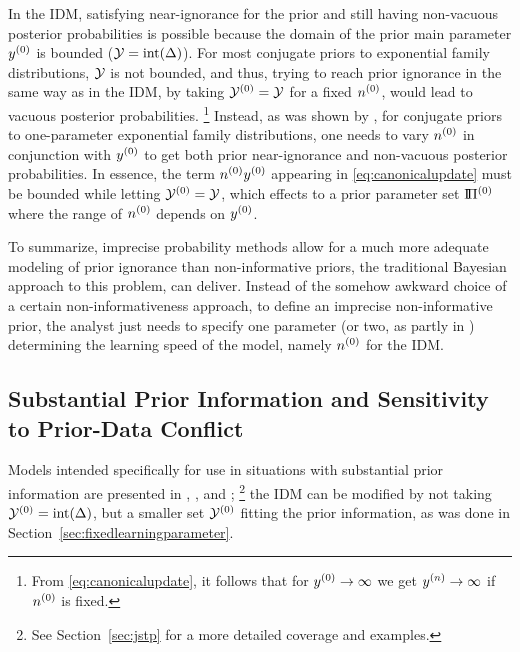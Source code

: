 In the IDM, satisfying near-ignorance for the prior and still having non-vacuous posterior probabilities is possible
because the domain of the prior main parameter $y^{(0)}$ is bounded ($\mathcal{Y} = \text{int}(\Delta)$).
For most conjugate priors to exponential family distributions, $\mathcal{Y}$ is not bounded,
and thus, trying to reach prior ignorance in the same way as in the IDM,
by taking $\mathcal{Y}^{(0)} = \mathcal{Y}$ for a fixed $n^{(0)}$, would lead to vacuous posterior probabilities.%
\footnote{From \eqref{eq:canonicalupdate}, it follows that for $y^{(0)} \rightarrow \infty$ we get $y^{(n)} \rightarrow \infty$ if $n^{(0)}$ is fixed.}
Instead, as was shown by \textcite{2012:benavolizaffalon}, for conjugate priors to one-parameter exponential family distributions,
one needs to vary $n^{(0)}$ in conjunction with $y^{(0)}$ to get both prior near-ignorance and non-vacuous posterior probabilities.
In essence, the term $n^{(0)} y^{(0)}$ appearing in \eqref{eq:canonicalupdate} must be bounded while letting $\mathcal{Y}^{(0)} = \mathcal{Y}$,
which effects to a prior parameter set $\text{I}\!\Pi^{(0)}$ where the range of $n^{(0)}$ depends on $y^{(0)}$.

To summarize, imprecise probability methods allow for a much more adequate modeling of prior ignorance
than non-informative priors, the traditional Bayesian approach to this problem, can deliver.
Instead of the somehow awkward choice of a certain non-informativeness approach,
to define an imprecise non-informative prior, the analyst just needs to specify one parameter
(or two, as partly in \textcite{2012:benavolizaffalon})
determining the learning speed of the model, namely $n^{(0)}$ for the IDM.


\subsection{Substantial Prior Information and Sensitivity to Prior-Data Conflict}
\label{sec:pdc-sensitivity}

Models intended specifically for use in situations with substantial prior information are presented in
\textcite[footnote no.~10 in \S 1.1.4, and \S 7.8.3]{1991:walley}, \textcite{2005:quaeghebeurcooman}, and \textcite{Walter2009a};%
\footnote{See Section~\ref{sec:jstp} for a more detailed coverage and examples.}
the IDM can be modified by not taking $\mathcal{Y}^{(0)} = \text{int}(\Delta)$, but a smaller set $\mathcal{Y}^{(0)}$ fitting the prior information,
as was done in Section~\ref{sec:fixedlearningparameter}.

